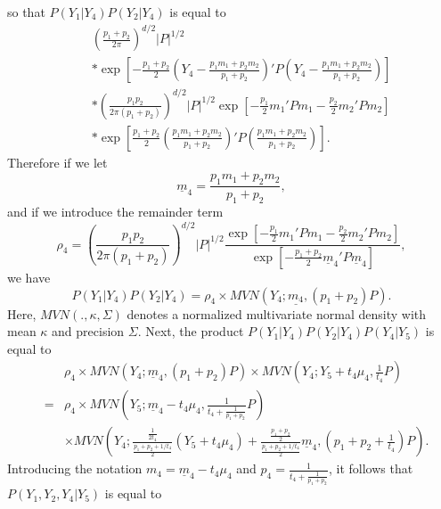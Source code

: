 \documentclass[12pt]{article}
\begin{document}
so that $P(Y_1 | Y_4) P(Y_2 | Y_4 )$ is equal to
\begin{eqnarray}
& & \left( \frac{p_1 + p_2}{2 \pi} \right) ^{d/2} |P|^{1/2} \\
& & * \exp \left[ -\frac{p_1 + p_2}{2} \left( Y_4  - \frac{p_1 m_1 + p_2 m_2}{p_1 + p_2} \right)' P  \left( Y_4  - \frac{p_1 m_1 + p_2 m_2}{p_1 + p_2} \right) \right] \\
& & * \left( \frac{p_1 p_2}{2 \pi (p_1 + p_2)} \right)^{d/2}  |P|^{1/2} \exp \left[ -\frac{p_1}{2} m_1' P m_1 -\frac{p_2}{2}m_2'P m_2  \right] \\
& & * \exp \left[ \frac{p_1 + p_2}{2} \left(  \frac{p_1 m_1 + p_2 m_2}{p_1 + p_2} \right)' P    
\left(  \frac{p_1 m_1 + p_2 m_2}{p_1 + p_2} \right)  \right] .
\end{eqnarray}
Therefore if we let
\begin{equation}
\underline{m}_4 = \frac{p_1 m_1 + p_2 m_2}{p_1 + p_2},
\end{equation}
and if we introduce the remainder term
\begin{equation}
\rho_4 =  \left( \frac{p_1 p_2}{2 \pi (p_1 + p_2)} \right)^{d/2}  |P|^{1/2} \frac {\exp \left[ -\frac{p_1}{2} m_1' P m_1 -\frac{p_2}{2}m_2'P m_2  \right] }
{ \exp \left[ -\frac{p_1 + p_2}{2} \underline{m}_4' P \underline{m}_4 \right] } ,
\end{equation}
we have
\begin{equation}
P(Y_1 | Y_4) P(Y_2 | Y_4 ) = \rho_4 \times MVN(Y_4 ; \underline{m_4} , (p_1 + p_2)P).
\end{equation}
Here, $MVN(., \kappa, \Sigma)$ denotes a normalized multivariate normal density with mean $\kappa$ and
precision $\Sigma$.
Next, the product $P(Y_1 | Y_4) P(Y_2 | Y_4 ) P(Y_4 | Y_5)$ is equal to
\begin{eqnarray}
& & \rho_4 \times MVN (Y_4 ; \underline{m}_4 , (p_1 + p_2)P) \times MVN \left( Y_4; Y_5 + t_4 \mu_4 , \frac{1}{t_4} P \right) \\
& = & \rho_4 \times MVN \left( Y_5 ; \underline{m}_4 - t_4 \mu_4 , \frac{1}{t_4 + \frac{1}{p_1 + p_2} } P  \right)  \\
& & \times MVN \left(Y_4 ; \frac{ \frac{1}{2t_4}}{\frac{p_1+p_2 + 1/t_4}{2}}(Y_5 + t_4 \mu_4) + 
\frac{  \frac{p_1 +p_2}{2}}{\frac{p_1+p_2 + 1/t_4}{2}} \underline{m}_4, (p_1 + p_2 + \frac{1}{t_4})P \right) .
\end{eqnarray}
Introducing the notation $m_4 = \underline{m}_4 - t_4 \mu_4$ and $p_4 = \frac{1}{t_4 + \frac{1}{p_1 + p_2} }$, it follows that
$P(Y_1,Y_2,Y_4 | Y_5)$ is equal to
\end{document}
